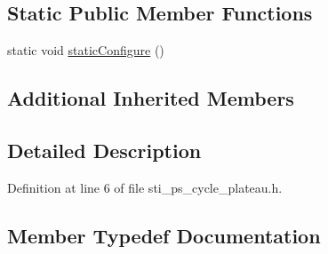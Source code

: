 \subsection*{Static Public Member Functions}
\begin{DoxyCompactItemize}
\item 
static void \hyperlink{structsm__respira__1_1_1ps__cycle__inner__states_1_1StiPSCyclePlateau_a69e6bd09d36ec45f51287c6787dec2b5}{static\+Configure} ()
\end{DoxyCompactItemize}
\subsection*{Additional Inherited Members}


\subsection{Detailed Description}


Definition at line 6 of file sti\+\_\+ps\+\_\+cycle\+\_\+plateau.\+h.



\subsection{Member Typedef Documentation}
\mbox{\label{structsm__respira__1_1_1ps__cycle__inner__states_1_1StiPSCyclePlateau_a8bbf7a1639dec1403c8a64cee4814687}} 
